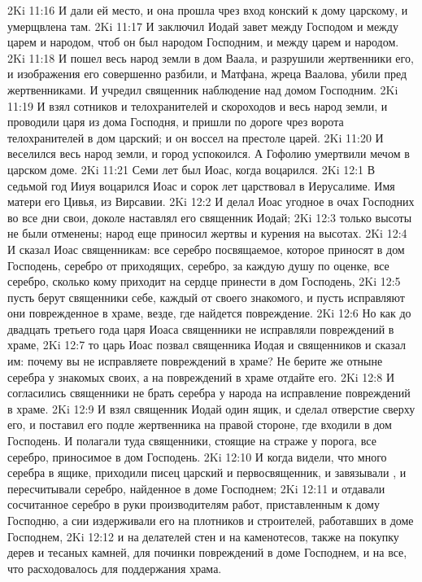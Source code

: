 \vs 2Ki 11:16 И дали ей место, и она прошла чрез вход конский к дому царскому, и умерщвлена там.
\rsbpar\vs 2Ki 11:17 И заключил Иодай завет между Господом и между царем и народом, чтоб он был народом Господним, и между царем и народом.
\vs 2Ki 11:18 И пошел весь народ земли в дом Ваала, и разрушили жертвенники его, и изображения его совершенно разбили, и Матфана, жреца Ваалова, убили пред жертвенниками. И учредил священник наблюдение над домом Господним.
\vs 2Ki 11:19 И взял сотников и телохранителей и скороходов и весь народ земли, и проводили царя из дома Господня, и пришли по дороге чрез ворота телохранителей в дом царский; и он воссел на престоле царей.
\vs 2Ki 11:20 И веселился весь народ земли, и город успокоился. А Гофолию умертвили мечом в царском доме.
\vs 2Ki 11:21 Семи лет был Иоас, когда воцарился.
\vs 2Ki 12:1 В седьмой год Ииуя воцарился Иоас и сорок лет царствовал в Иерусалиме. Имя матери его Цивья, из Вирсавии.
\vs 2Ki 12:2 И делал Иоас угодное в очах Господних во все дни свои, доколе наставлял его священник Иодай;
\vs 2Ki 12:3 только высоты не были отменены; народ еще приносил жертвы и курения на высотах.
\vs 2Ki 12:4 И сказал Иоас священникам: все серебро посвящаемое, которое приносят в дом Господень, серебро от приходящих, серебро,  за каждую душу по оценке, все серебро, сколько кому приходит на сердце принести в дом Господень,
\vs 2Ki 12:5 пусть берут священники себе, каждый от своего знакомого, и пусть исправляют они поврежденное в храме, везде, где найдется повреждение.
\vs 2Ki 12:6 Но как до двадцать третьего года царя Иоаса священники не исправляли повреждений в храме,
\vs 2Ki 12:7 то царь Иоас позвал священника Иодая и священников и сказал им: почему вы не исправляете повреждений в храме? Не берите же отныне серебра у знакомых своих, а на  повреждений в храме отдайте его.
\vs 2Ki 12:8 И согласились священники не брать серебра у народа на исправление повреждений в храме.
\vs 2Ki 12:9 И взял священник Иодай один ящик, и сделал отверстие сверху его, и поставил его подле жертвенника на правой стороне, где входили в дом Господень. И полагали туда священники, стоящие на страже у порога, все серебро, приносимое в дом Господень.
\vs 2Ki 12:10 И когда видели, что много серебра в ящике, приходили писец царский и первосвященник, и завязывали , и пересчитывали серебро, найденное в доме Господнем;
\vs 2Ki 12:11 и отдавали сосчитанное серебро в руки производителям работ, приставленным к дому Господню, а сии издерживали его на плотников и строителей, работавших в доме Господнем,
\vs 2Ki 12:12 и на делателей стен и на каменотесов, также на покупку дерев и тесаных камней, для починки повреждений в доме Господнем, и на все, что расходовалось для поддержания храма.
